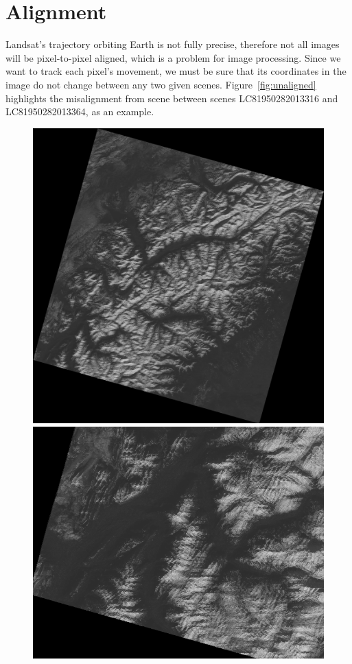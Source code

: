 \documentclass[11pt, a4paper]{report}
\begin{document}
	\section{Alignment}
	\label{seq:alignment_functional}
	Landsat's trajectory orbiting Earth is not fully precise, therefore not all images will be pixel-to-pixel aligned, which is a problem for image processing. Since we want to track each pixel's movement, we must be sure that its coordinates in the image do not change between any two given scenes. Figure~\ref{fig:unaligned} highlights the misalignment from scene between scenes LC81950282013316 and LC81950282013364, as an example.
	\begin{figure}[h]
	\centering
	\begin{minipage}{0.36\textwidth}
		\centering
		\includegraphics[width=\linewidth]{../images/unaligned.png}
	\end{minipage}
	\begin{minipage}{0.45\textwidth}
		\centering
		\includegraphics[width=\linewidth]{../images/unaligned_part.png}

\end{minipage}
\end{figure}
\end{document}
